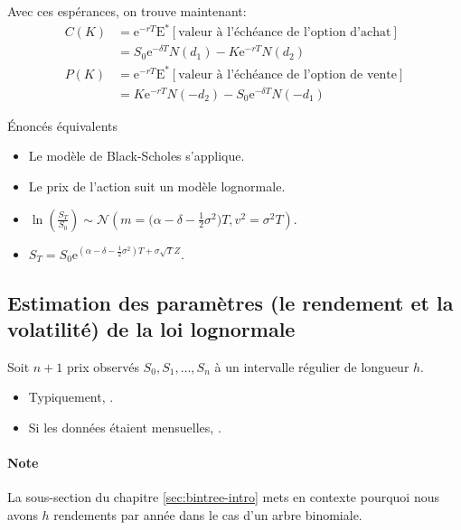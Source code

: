 \documentclass[10pt, french]{article}
\begin{document}
\begin{multicols*}{2}
\begin{definitionNOHFILL}
Avec ces espérances, on trouve maintenant:
\begin{align*}
	C(K)
	&=	\textrm{e}^{-r T}\text{E}^{*}[\text{valeur à l'échéance de l'option d'achat}]	\\
	&=	S_{0} \textrm{e}^{-\delta T}N(d_{1}) - K\textrm{e}^{-r T} N(d_{2})	\\
	P(K)
	&=	\textrm{e}^{-r T}\text{E}^{*}[\text{valeur à l'échéance de l'option de vente}]	\\
	&=	K\textrm{e}^{-r T} N(-d_{2}) - S_{0} \textrm{e}^{-\delta T}N(-d_{1})	
\end{align*}
\end{definitionNOHFILL}

\begin{conceptgen}{Énoncés équivalents}
\begin{itemize}[leftmargin = *]
	\item	Le modèle de Black-Scholes s'applique.
	\item	Le prix de l'action suit un modèle lognormale.
	\item	$\ln\left(\frac{S_{T}}{S_{0}}\right) \sim \mathcal{N}\left(m = \Big(\alpha - \delta - \frac{1}{2}\sigma^{2}\Big)T, v^{2} = \sigma^{2}T\right)$.
	\item	$S_{T} =	S_{0}\textrm{e}^{(\alpha - \delta - \frac{1}{2}\sigma^{2})T + \sigma\sqrt{T}Z}$.
\end{itemize}
\end{conceptgen}

\columnbreak
\subsection*{Estimation des paramètres (le rendement et la volatilité) de la loi lognormale}
Soit $n + 1$ prix observés $S_{0}, S_{1}, \dots, S_{n}$ à un intervalle régulier de longueur $h$.
\begin{itemize}
	\item	Typiquement, .
	\item	Si les données étaient mensuelles, .
\end{itemize}

\paragraph{Note}	La sous-section  du chapitre \ref{sec:bintree-intro} mets en contexte pourquoi nous avons $h$ rendements par année dans le cas d'un arbre binomiale.


\end{multicols*}
\end{document}
